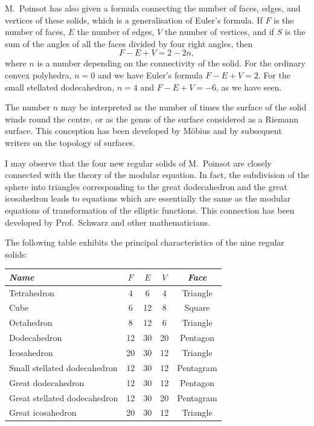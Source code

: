 \documentclass[11pt,a4paper]{book}
\begin{document}
\setcounter{page}{84}

M.~Poinsot has also given a formula connecting the number of faces, edges, and vertices of these solids, which is a generalisation of Euler's formula. If $F$ is the number of faces, $E$ the number of edges, $V$ the number of vertices, and if $S$ is the sum of the angles of all the faces divided by four right angles, then
\[
F - E + V = 2 - 2n,
\]
where $n$ is a number depending on the connectivity of the solid. For the ordinary convex polyhedra, $n=0$ and we have Euler's formula $F-E+V=2$. For the small stellated dodecahedron, $n=4$ and $F-E+V=-6$, as we have seen.

The number $n$ may be interpreted as the number of times the surface of the solid winds round the centre, or as the genus of the surface considered as a Riemann surface. This conception has been developed by Möbius and by subsequent writers on the topology of surfaces.

\setcounter{page}{85}

I may observe that the four new regular solids of M.~Poinsot are closely connected with the theory of the modular equation. In fact, the subdivision of the sphere into triangles corresponding to the great dodecahedron and the great icosahedron leads to equations which are essentially the same as the modular equations of transformation of the elliptic functions. This connection has been developed by Prof.~Schwarz and other mathematicians.

The following table exhibits the principal characteristics of the nine regular solids:

\begin{center}
\begin{tabular}{lcccc}
\toprule
\textit{Name} & $F$ & $E$ & $V$ & \textit{Face} \\
\midrule
Tetrahedron & 4 & 6 & 4 & Triangle \\
Cube & 6 & 12 & 8 & Square \\
Octahedron & 8 & 12 & 6 & Triangle \\
Dodecahedron & 12 & 30 & 20 & Pentagon \\
Icosahedron & 20 & 30 & 12 & Triangle \\
Small stellated dodecahedron & 12 & 30 & 12 & Pentagram \\
Great dodecahedron & 12 & 30 & 12 & Pentagon \\
Great stellated dodecahedron & 12 & 30 & 20 & Pentagram \\
Great icosahedron & 20 & 30 & 12 & Triangle \\
\bottomrule
\end{tabular}
\end{center}
\end{document}
